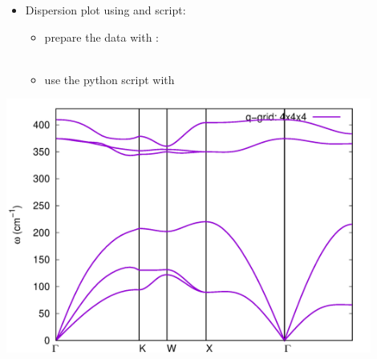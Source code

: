 \documentclass[landscape]{foils}
\begin{document}
\parbox{18cm}{\small
\begin{itemize}
  \item  Dispersion plot using  and  script:
  \begin{itemize}
	\item prepare the data with :\\[0.1em]
		\\ 
	\item use the python script  with 
		 \\
   \end{itemize}
\end{itemize}
}
\vskip 2cm 
\begin{center}
\parbox{14cm}{
	\includegraphics[width=12cm]{../pictures/phonon_dispersion.png} 
	}
\end{center}
\end{document}
